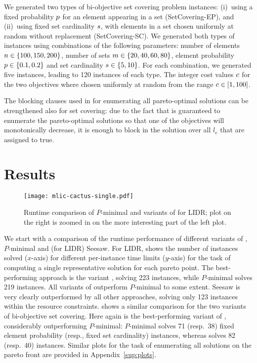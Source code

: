 We generated two types of  bi-objective set covering problem instances:
(i)~using a fixed probability $p$ for an element appearing in a set (SetCovering-EP), and (ii)~using fixed set cardinality $s$,
with elements in a set chosen uniformly at random without replacement (SetCovering-SC).
We generated both types of instances using combinations of the following parameters: number of elements $n\in\{100,150,200\}$,
number of sets $m\in\{20,40,60,80\}$, element probability $p\in\{0.1,0.2\}$ and set cardinality $s\in\{5,10\}$.
For each combination, we generated five instances, leading to 120 instances of each type.
The integer cost values $c$ for the two objectives where chosen uniformly at random from the range $c\in[1,100]$.

The blocking clauses used in \algname{} for enumerating all pareto-optimal solutions can be strengthened also for set covering:
due to the fact that \algname{} is guaranteed to enumerate the pareto-optimal solutions
so that one of the objectives will monotonically decrease, it is enough to block in \algname{} the
solution over all $l_e$ that are assigned to true.

\section{Results\label{sec:results}}

\begin{figure}
    \centering
    \texttt{[image: mlic-cactus-single.pdf]}
    \caption{Runtime comparison of  $P$-minimal and variants of \algname{} for LIDR; plot on the right
      is zoomed in on the more interesting part of the left plot.
    }\label{fig:mlic-cactus}
\end{figure}

We start with a comparison of the runtime performance of different variants of \algname{}, $P$-minimal and (for LIDR) Seesaw.
For LIDR,  shows the number of instances solved ($x$-axis) for different per-instance time limits ($y$-axis) for the task of
computing a single representative solution for each pareto point.
The best-performing approach is the \algname{} variant \msh{}, solving 223 instances, while $P$-minimal solves 219 instances.
All  variants of \algname{} outperform $P$-minimal to some extent.
Seesaw is very clearly outperformed by all other approaches, solving only 123 instances within the resource constraints.
 shows a similar comparison for the two variants of bi-objective set covering.
Here again \msh{} is the best-performing variant of \algname{}, considerably outperforming $P$-minimal:
$P$-minimal  solves 71 (resp.~38) fixed element probability (resp., fixed set cardinality) instances,
whereas \msh{} solves  82 (resp.~40) instances.
Similar plots for the task of enumerating all solutions on the pareto front are provided in Appendix~\ref{sup:plots}.

